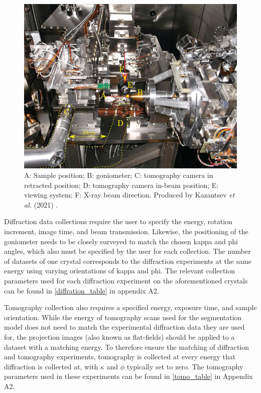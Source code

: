 \begin{figure}
    \centering
    \includegraphics{images/tomo camera.png}
    \caption{A: Sample position; B: goniometer; C: tomography camera in retracted position; D: tomography camera in-beam position; E: viewing system; F: X-ray beam direction. Produced by Kazantsev \textit{et al.} (2021) \cite{Kazantsev2021}.}
    \label{fig:vacuum_chamber}
\end{figure}

Diffraction data collections require the user to specify the energy, rotation increment, image time, and beam transmission. Likewise, the positioning of the goniometer needs to be closely surveyed to match the chosen kappa and phi angles, which also must be specified by the user for each collection. The number of datasets of one crystal corresponds to the diffraction experiments at the same energy using varying orientations of kappa and phi. The relevant collection parameters used for each diffraction experiment on the aforementioned crystals can be found in \cref{diffration_table} in appendix A2.

Tomography collection also requires a specified energy, exposure time, and sample orientation. While the energy of tomography scans used for the segmentation model does not need to match the experimental diffraction data they are used for, the projection images (also known as flat-fields) should be applied to a dataset with a matching energy. To therefore ensure the matching of diffraction and tomography experiments, tomography is collected at every energy that diffraction is collected at, with $\kappa$ and $\phi$ typically set to zero. The tomography parameters used in these experiments can be found in \cref{tomo_table} in Appendix A2.

